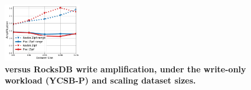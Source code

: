 \begin{figure}[th]
\centering
\includegraphics[width=0.3\textwidth]{figs/P_write_amplification_disk_line.pdf}
\caption{\bf{\sys\/ versus RocksDB write amplification, under the write-only workload (YCSB-P) and scaling dataset sizes.}}
\label{fig:writeamp}
\end{figure}

